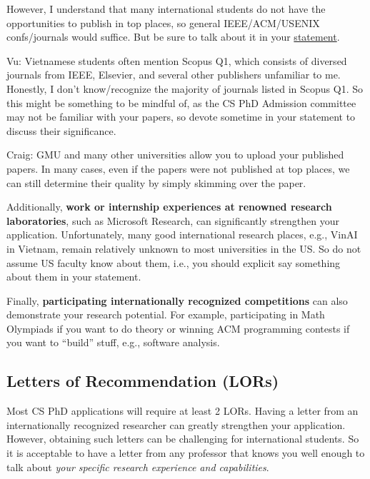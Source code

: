 \documentclass[10pt]{article}
\begin{document}
However, I understand that many international students do not have the opportunities to publish in top places, so general IEEE/ACM/USENIX confs/journals would suffice.  But be sure to talk about it in your \hyperref[sec:research-statement]{statement}.

\begin{tcolorbox}[left=1pt,right=1pt,top=1pt,bottom=1pt]
Vu: Vietnamese students often mention Scopus Q1, which consists of diversed journals from IEEE, Elsevier, and several other publishers unfamiliar to me.  Honestly, I don't know/recognize the majority of journals listed in Scopus Q1. So this might be something to be mindful of, as the CS PhD Admission committee may not be familiar with your papers, so devote sometime in your statement to discuss their significance.
\end{tcolorbox}

\begin{tcolorbox}[left=1pt,right=1pt,top=1pt,bottom=1pt]
Craig: GMU and many other universities allow you to upload your published papers. In many cases, even if the papers were not published at top places, we can still determine their quality by simply skimming over the paper.  
\end{tcolorbox}

Additionally, \textbf{work or internship experiences at renowned research laboratories}, such as Microsoft Research, can significantly strengthen your
application.  Unfortunately, many good international research places, e.g., VinAI in Vietnam, remain relatively unknown to most universities in the US. So do not assume US faculty know about them, i.e., you should explicit say something about them in your statement.

Finally, \textbf{participating internationally recognized competitions} can also demonstrate your research potential.
For example, participating in Math Olympiads if you want to do theory or  winning ACM programming contests if you want to ``build'' stuff, e.g., software analysis.


\subsection{Letters of Recommendation (LORs)}

Most CS PhD applications will require at least 2 LORs. Having a letter from an internationally recognized researcher can
greatly strengthen your application. However, obtaining such letters
can be challenging for international students. So it is acceptable to have a letter from any professor
that knows you well enough to talk about \emph{your specific research experience and capabilities}.
\end{document}
